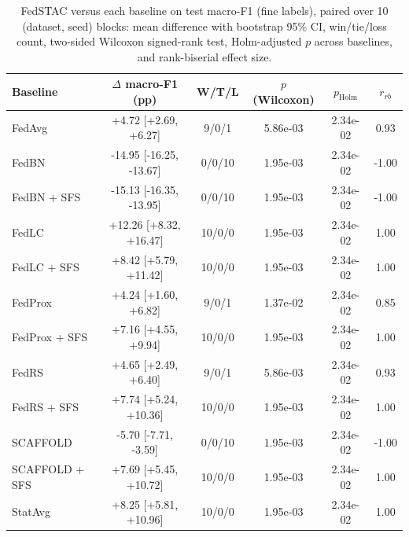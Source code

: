 \begin{table}[t]
\centering
\caption{FedSTAC versus each baseline on test macro-F1 (fine labels), paired over 10 (dataset, seed) blocks: mean difference with bootstrap 95\% CI, win/tie/loss count, two-sided Wilcoxon signed-rank test, Holm-adjusted $p$ across baselines, and rank-biserial effect size.}
\label{tab:stats_fine}
\small
\begin{tabular}{lccccc}
\toprule
Baseline & $\Delta$ macro-F1 (pp) & W/T/L & $p$ (Wilcoxon) & $p_{\text{Holm}}$ & $r_{rb}$ \\
\midrule
FedAvg & +4.72 [+2.69, +6.27] & 9/0/1 & 5.86e-03 & 2.34e-02 & 0.93 \\
FedBN & -14.95 [-16.25, -13.67] & 0/0/10 & 1.95e-03 & 2.34e-02 & -1.00 \\
FedBN + SFS & -15.13 [-16.35, -13.95] & 0/0/10 & 1.95e-03 & 2.34e-02 & -1.00 \\
FedLC & +12.26 [+8.32, +16.47] & 10/0/0 & 1.95e-03 & 2.34e-02 & 1.00 \\
FedLC + SFS & +8.42 [+5.79, +11.42] & 10/0/0 & 1.95e-03 & 2.34e-02 & 1.00 \\
FedProx & +4.24 [+1.60, +6.82] & 9/0/1 & 1.37e-02 & 2.34e-02 & 0.85 \\
FedProx + SFS & +7.16 [+4.55, +9.94] & 10/0/0 & 1.95e-03 & 2.34e-02 & 1.00 \\
FedRS & +4.65 [+2.49, +6.40] & 9/0/1 & 5.86e-03 & 2.34e-02 & 0.93 \\
FedRS + SFS & +7.74 [+5.24, +10.36] & 10/0/0 & 1.95e-03 & 2.34e-02 & 1.00 \\
SCAFFOLD & -5.70 [-7.71, -3.59] & 0/0/10 & 1.95e-03 & 2.34e-02 & -1.00 \\
SCAFFOLD + SFS & +7.69 [+5.45, +10.72] & 10/0/0 & 1.95e-03 & 2.34e-02 & 1.00 \\
StatAvg & +8.25 [+5.81, +10.96] & 10/0/0 & 1.95e-03 & 2.34e-02 & 1.00 \\
\bottomrule
\end{tabular}
\end{table}
